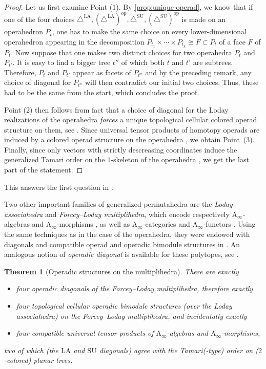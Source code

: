 \documentclass{amsart}
\newtheorem{theorem}{Theorem}[section]
\theoremstyle{definition}
\newcommand{\SU}{\mathrm{SU}}
\newcommand{\LA}{\mathrm{LA}}
\newcommand{\SUD}{\triangle^{\mathrm{SU}}}
\newcommand{\LAD}{\triangle^{\mathrm{LA}}}
\newcommand{\Ainf}{\ensuremath{\mathrm{A}_\infty}}
\newcommand{\op}{\mathrm{op}}
\begin{document}
\begin{proof}
    Let us first examine Point (1).
    By \cref{prop:unique-operad}, we know that if one of the four choices $\LAD, (\LAD)^\op, \SUD, (\SUD)^\op$ is made on an operahedron $P_t$, one has to make the same choice on every lower-dimensional operahedron appearing in the decomposition $P_{t_1} \times \cdots \times P_{t_k} \cong F \subset P_t$ of a face $F$ of $P_t$. 
    Now suppose that one makes two distinct choices for two operahedra $P_t$ and $P_{t'}$.
    It is easy to find a bigger tree $t''$ of which both $t$ and $t'$ are subtrees.
    Therefore, $P_t$ and $P_{t'}$ appear as facets of $P_{t''}$ and by the preceding remark, any choice of diagonal for $P_{t''}$ will then contradict our initial two choices. 
    Thus, these had to be the same from the start, which concludes the proof. 

    Point (2) then follows from fact that a choice of diagonal for the Loday realizations of the operahedra \emph{forces} a unique topological cellular colored operad structure on them, see \cite[Theorem 4.18]{LA21}.
    Since universal tensor products of homotopy operads are induced by a colored operad structure on the operahedra \cite[Cor. 4.24]{LA21}, we obtain Point~(3).
    Finally, since only vectors with strictly descreasing coordinates induce the generalized Tamari order on the $1$-skeleton of the operahedra \cite[Prop. 3.11]{LA21}, we get the last part of the statement. 
\end{proof}

This answers the first question in \cite[Remark 3.14]{LA21}.

Two other important families of generalized permutahedra are the \emph{Loday associahedra} and \emph{Forcey--Loday multiplihedra}, which encode respectively $\Ainf$-algebras and $\Ainf$-morphisms \cite[Prop. 4.9]{MazuirLA22}, as well as $\Ainf$-categories and $\Ainf$-functors \cite[Section 4.3]{MazuirLA22}.
Using the same techniques as in the case of the operahedra, they were endowed with diagonals and compatible operad and operadic bimodule structures in \cite[Theorem~1]{MazuirLA22}.
An analogous notion of \emph{operadic diagonal} is available for these polytopes, see \cite[Proposition 2.14]{MazuirLA22}.

\begin{samepage}
\begin{theorem}[Operadic structures on the multiplihedra]
There are exactly 
\begin{itemize}
    \item four operadic diagonals of the Forcey--Loday multiplihedra, therefore exactly
    \item four topological cellular operadic bimodule structures (over the Loday associahedra) on the Forcey--Loday multiplihedra, and incidentally exactly
    \item four compatible universal tensor products of $\Ainf$-algebras and $\Ainf$-morphisms,
\end{itemize}
two of which (the $\LA$ and $\SU$ diagonals) agree with the Tamari(-type) order on ($2$-colored) planar trees. 
\end{theorem}
\end{samepage}
\end{document}
